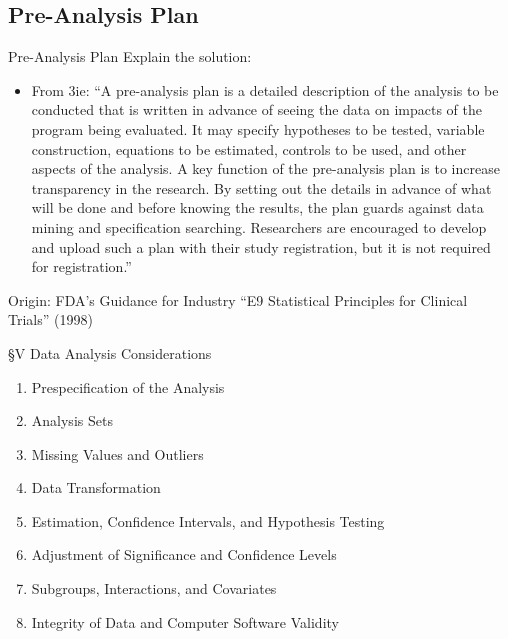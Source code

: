 \documentclass{beamer}
\begin{document}
{ %
    \begin{frame}[plain]
     \end{frame}
}

\subsection*{Pre-Analysis Plan}
\begin{frame}{Pre-Analysis Plan}
Explain the solution:
\begin{itemize}
\item
From 3ie: ``A pre-analysis plan is a detailed description of the analysis to be conducted that is written in advance of seeing the data on impacts of the program being evaluated. It may specify hypotheses to be tested, variable construction, equations to be estimated, controls to be used, and other aspects of the analysis. A key function of the pre-analysis plan is to increase transparency in the research. By setting out the details in advance of what will be done and before knowing the results, the plan guards against data mining and specification searching. Researchers are encouraged to develop and upload such a plan with their study registration, but it is not required for registration.''
\end{itemize}
\end{frame}

\begin{frame}{Origin: FDA's Guidance for Industry}
``E9 Statistical Principles for Clinical Trials'' (1998)
\href{http://www.fda.gov/downloads/drugs/guidancecomplianceregulatoryinformation/guidances/ucm073137.pdf}{}

\S V Data Analysis Considerations
\begin{enumerate}[<.->]
\item Prespecification of the Analysis
\item Analysis Sets
\item Missing Values and Outliers
\item Data Transformation
\item Estimation, Confidence Intervals, and Hypothesis Testing
\item Adjustment of Significance and Confidence Levels
\item Subgroups, Interactions, and Covariates
\item Integrity of Data and Computer Software Validity
\end{enumerate}
\end{frame}
\end{document}
